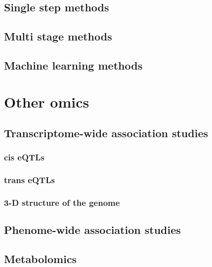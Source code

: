 \documentclass[]{book}
\theoremstyle{definition}
\theoremstyle{definition}
\theoremstyle{definition}
\theoremstyle{remark}
\begin{document}
\section{Single step methods}\label{single-step-methods-1}

\section{Multi stage methods}\label{multi-stage-methods-1}

\section{Machine learning methods}\label{machine-learning-methods-1}

\chapter{Other omics}\label{other-omics}

\section{Transcriptome-wide association
studies}\label{transcriptome-wide-association-studies}

\subsection{cis eQTLs}\label{cis-eqtls}

\subsection{trans eQTLs}\label{trans-eqtls}

\subsection{3-D structure of the
genome}\label{d-structure-of-the-genome}

\section{Phenome-wide association
studies}\label{phenome-wide-association-studies}

\section{Metabolomics}\label{metabolomics}
\end{document}
